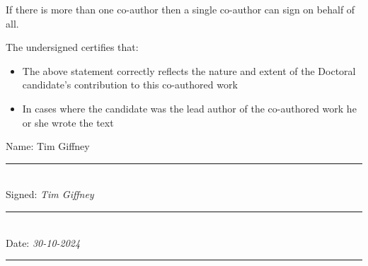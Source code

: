 \documentclass[a4paper, 11pt, oneside]{Thesis}  %
\begin{document}
{		If there is more than one co-author then a single co-author can sign on behalf of all.
		
		The undersigned certifies that:
		\begin{itemize}
			\item The above statement correctly reflects the nature and extent of the Doctoral candidate’s contribution to this co-authored work
			\item In cases where the candidate was the lead author of the co-authored work he or she wrote the text
		\end{itemize}
			
		Name: Tim Giffney \\
		\hspace{1cm}\rule[1em]{20em}{0.5pt} \\  %
		Signed: \textit{Tim Giffney}\\
		\hspace{1cm}\rule[1em]{20em}{0.5pt} \\  %
		Date: \textit{30-10-2024}\\
		\hspace{1cm}\rule[1em]{20em}{0.5pt} \\ %
	}
	\clearpage  %
	
\end{document}
